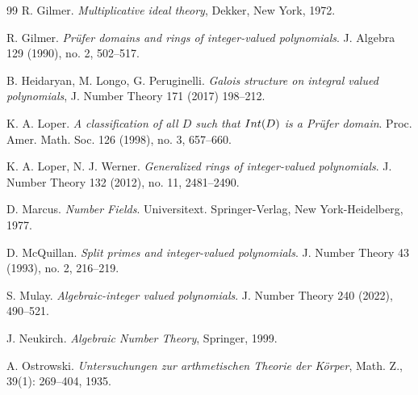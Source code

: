 \documentclass{article}
\theoremstyle{definition}\newtheorem{Def}[equation]{Definition}
\theoremstyle{definition}\newtheorem{Ques}[equation]{Question}
\theoremstyle{definition}\newtheorem{Conj}[equation]{Conjecture}
\theoremstyle{definition}\newtheorem{Not}[equation]{Notation}
\newcommand{\Int}{\textnormal{Int}}
\numberwithin{equation}{section}
\begin{document}
\begin{thebibliography}{99}
 R. Gilmer. \emph{Multiplicative ideal theory}, Dekker, New York, 1972.

 R. Gilmer. \emph{Pr\"ufer domains and rings of integer-valued polynomials}. J. Algebra 129 (1990), no. 2, 502--517. 




 B. Heidaryan, M. Longo, G. Peruginelli. \emph{Galois structure on integral valued polynomials}, J. Number Theory 171 (2017) 198--212.

 K. A. Loper. \emph{A classification of all $D$ such that $\Int(D)$ is a Pr\"ufer domain}. Proc. Amer. Math. Soc. 126 (1998), no. 3, 657--660.

 K. A. Loper, N. J. Werner. \emph{Generalized rings of integer-valued polynomials}. J. Number Theory 132 (2012), no. 11, 2481--2490.



 D. Marcus. \emph{Number Fields}. Universitext. Springer-Verlag, New York-Heidelberg, 1977.


 D. McQuillan. \emph{Split primes and integer-valued polynomials}. J. Number Theory 43 (1993), no. 2, 216--219. 

 S. Mulay. \emph{Algebraic-integer valued polynomials}. J. Number Theory 240 (2022), 490--521.

 J. Neukirch. {\em Algebraic Number Theory}, Springer, 1999.

 A. Ostrowski. \emph{Untersuchungen zur arthmetischen {T}heorie der {K}\"{o}rper}, Math. Z., 39(1): 269--404, 1935.




\end{thebibliography}
\end{document}
